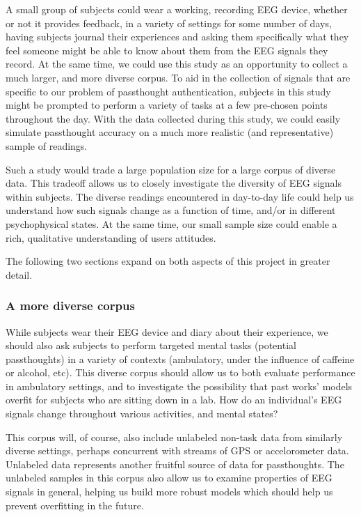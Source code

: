 \documentclass[sigconf]{acmart}
\begin{document}
A small group of subjects could wear a working, recording EEG device, whether or not it provides feedback, in a variety of settings for some number of days,
having subjects journal their experiences and asking them specifically what they feel someone might be able to know about them from the EEG signals they record.
At the same time, we could use this study as an opportunity to collect a much larger, and more diverse corpus.
To aid in the collection of signals that are specific to our problem of passthought authentication,
subjects in this study might be prompted to perform a variety of tasks at a few pre-chosen points throughout the day.
With the data collected during this study, we could easily simulate passthought accuracy on a much more realistic (and representative) sample of readings.

Such a study would trade a large population size for a large corpus of diverse data.
This tradeoff allows us to closely investigate the diversity of EEG signals within subjects.
The diverse readings encountered in day-to-day life could help us understand how such signals change as a function of time, and/or in different psychophysical states.
At the same time, our small sample size could enable a rich, qualitative understanding of users attitudes.

The following two sections expand on both aspects of this project in greater detail.

\subsubsection{A more diverse corpus}
\label{sec:org6aad8bd}

While subjects wear their EEG device and diary about their experience, we should also ask subjects to perform
targeted mental tasks (potential passthoughts) in a variety of contexts (ambulatory, under the influence of caffeine or alcohol, etc). 
This diverse corpus should allow us to both evaluate performance in ambulatory settings, and to
investigate the possibility that past works' models overfit for subjects who are sitting down in a lab.
How do an individual's EEG signals change throughout various activities, and mental states?

This corpus will, of course, also include unlabeled non-task data from similarly diverse settings, perhaps concurrent with streams of GPS or accelorometer data.
Unlabeled data represents another fruitful source of data for passthoughts.
The unlabeled samples in this corpus also allow us to examine properties of EEG signals in general, helping us build more robust models which should help us prevent overfitting in the future.
\end{document}
